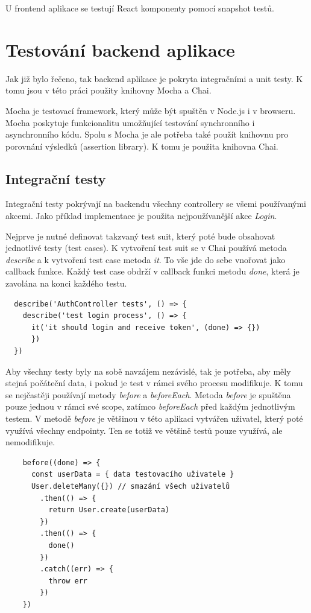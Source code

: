 \documentclass[thesis=M,czech]{FITthesis}[2018/10/20]
\begin{document}
	U frontend aplikace se testují React komponenty pomocí snapshot testů.
\section{Testování backend aplikace}
Jak již bylo řečeno, tak backend aplikace je pokryta integračními a unit testy. K tomu jsou v této práci použity knihovny Mocha a Chai.
	
	Mocha je testovací framework, který může být spuštěn v Node.js i v browseru. Mocha poskytuje funkcionalitu umožňující testování synchronního i asynchronního kódu. Spolu s Mocha je ale potřeba také použít knihovnu pro porovnání výsledků (assertion library). K tomu je použita knihovna Chai.
	
\subsection{Integrační testy}
Integrační testy pokrývají na backendu všechny controllery se všemi používanými akcemi. Jako příklad implementace je použita nejpoužívanější akce \textit{Login}.
	
	Nejprve je nutné definovat takzvaný test suit, který poté bude obsahovat jednotlivé testy (test cases). K vytvoření test suit se v Chai používá metoda \textit{describe} a k vytvoření test case metoda \textit{it}. To vše jde do sebe vnořovat jako callback funkce. Každý test case obdrží v callback funkci metodu \textit{done}, která je zavolána na konci každého testu.
\newpage
\begin{lstlisting}
  describe('AuthController tests', () => {
    describe('test login process', () => {
      it('it should login and receive token', (done) => {})  
      })  
  })  
\end{lstlisting}
Aby všechny testy byly na sobě navzájem nezávislé, tak je potřeba, aby měly stejná počáteční data, i pokud je test v rámci svého procesu modifikuje. K tomu se nejčastěji používají metody \textit{before} a \textit{beforeEach}. Metoda \textit{before} je spuštěna pouze jednou v rámci své scope, zatímco \textit{beforeEach} před každým jednotlivým testem. V metodě \textit{before} je většinou v této aplikaci vytvářen uživatel, který poté využívá všechny endpointy. Ten se totiž ve většině testů pouze využívá, ale nemodifikuje.
\begin{lstlisting}
    before((done) => {
      const userData = { data testovacího uživatele } 
      User.deleteMany({}) // smazání všech uživatelů
        .then(() => {
          return User.create(userData)
        })
        .then(() => {
          done()
        })
        .catch((err) => {
          throw err
        })  
    })    
\end{lstlisting}
\end{document}
